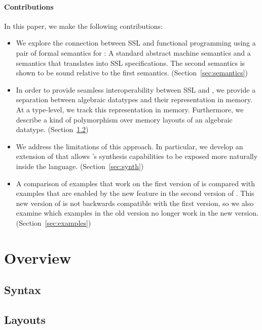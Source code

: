 \documentclass[acmsmall]{acmart}
\begin{document}
\paragraph{Contributions} In this paper, we make the following contributions:
\begin{itemize}
  \item We explore the connection between SSL and functional programming using a pair of formal semantics for \Pika: A standard abstract machine semantics and a
    semantics that translates \Pika{} into SSL specifications. The second semantics is shown to be sound relative to the first semantics. (Section~\ref{sec:semantics})

  \item In order to provide seamless interoperability between SSL and \Pika, we provide a separation between algebraic datatypes and their representation in memory.
    At a type-level, we track this representation in memory. Furthermore, we describe a kind of polymorphism over memory layouts of an algebraic datatype. (Section~\ref{sec:layouts})

  \item We address the limitations of this approach. In particular, we develop an extension of \Pika{} that allows \SuSLik's synthesis capabilities to be exposed more naturally inside the \Pika{} language. (Section~\ref{sec:synth})

  \item A comparison of examples that work on the first version of \Pika{} is compared with examples that are enabled by the new feature in the second version of \Pika. This new version of \Pika{} is not backwards compatible with the first version, so we also examine which examples in the old version no longer work in the new version. (Section~\ref{sec:examples})
\end{itemize}

\section{Overview}
\label{sec:overview}

\subsection{Syntax}
\label{sec:syntax}

\subsection{Layouts}
\label{sec:layouts}
\end{document}
